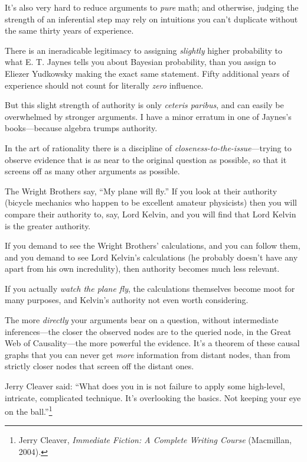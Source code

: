 {
 It's also very hard to reduce arguments to
\textit{pure} math; and otherwise, judging the strength of an
inferential step may rely on intuitions you can't
duplicate without the same thirty years of experience.}

{
 There is an ineradicable legitimacy to assigning \textit{slightly}
higher probability to what E. T. Jaynes tells you about Bayesian
probability, than you assign to Eliezer Yudkowsky making the exact same
statement. Fifty additional years of experience should not count for
literally \textit{zero} influence.}

{
 But this slight strength of authority is only \textit{ceteris
paribus}, and can easily be overwhelmed by stronger arguments. I have a
minor erratum in one of Jaynes's books---because
algebra trumps authority.}

\myendsectiontext


\bigskip


{
 In the art of rationality there is a discipline of
\textit{closeness-to-the-issue}{}---trying to observe evidence that is
as near to the original question as possible, so that it screens off as
many other arguments as possible. }

{
 The Wright Brothers say, ``My plane will
fly.'' If you look at their authority (bicycle
mechanics who happen to be excellent amateur physicists) then you will
compare their authority to, say, Lord Kelvin, and you will find that
Lord Kelvin is the greater authority.}

{
 If you demand to see the Wright Brothers'
calculations, and you can follow them, and you demand to see Lord
Kelvin's calculations (he probably
doesn't have any apart from his own incredulity), then
authority becomes much less relevant.}

{
 If you actually \textit{watch the plane fly}, the calculations
themselves become moot for many purposes, and Kelvin's
authority not even worth considering.}

{
 The more \textit{directly} your arguments bear on a question,
without intermediate inferences---the closer the observed nodes are to
the queried node, in the Great Web of Causality---the more powerful the
evidence. It's a theorem of these causal graphs that
you can never get \textit{more} information from distant nodes, than
from strictly closer nodes that screen off the distant ones.}

{
 Jerry Cleaver said: ``What does you in is not
failure to apply some high-level, intricate, complicated technique.
It's overlooking the basics. Not keeping your eye on
the ball.''\footnote{Jerry Cleaver, \textit{Immediate Fiction: A Complete Writing
Course} (Macmillan, 2004).}}

